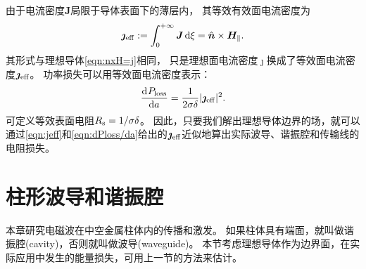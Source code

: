 由于电流密度$\bm J$局限于导体表面下的薄层内，
其等效有效面电流密度为
\begin{equation}
    \label{eqn:jeff}
    \bm\jmath_\mathrm{eff}:=\int_0^{+\infty}\bm J\mathop{}\!\mathrm{d}\xi=\mathop{}\!\hat{\bm{n}}\times\bm H_\parallel.
\end{equation}
其形式与理想导体\eqref{eqn:nxH=j}相同，
只是理想面电流密度$\bm\jmath$换成了等效面电流密度$\bm\jmath_\mathrm{eff}$。
功率损失可以用等效面电流密度表示：
\begin{equation}
    \label{eqn:dPloss/da}
    \frac{\mathrm{d}^{{}}P_\text{loss}}{\mathrm{d}{a}^{{}}}=\frac1{2\sigma\delta}|\bm\jmath_\mathrm{eff}|^2.
\end{equation}
可定义等效表面电阻$R_\text s=1/\sigma\delta$。
因此，只要我们解出理想导体边界的场，就可以通过\eqref{eqn:jeff}和\eqref{eqn:dPloss/da}给出的$\bm\jmath_\mathrm{eff}$近似地算出实际波导、谐振腔和传输线的电阻损失。

\section{柱形波导和谐振腔}

本章研究电磁波在中空金属柱体内的传播和激发。
如果柱体具有端面，就叫做谐振腔(cavity)，否则就叫做波导(waveguide)。
本节考虑理想导体作为边界面，在实际应用中发生的能量损失，可用上一节的方法来估计。

